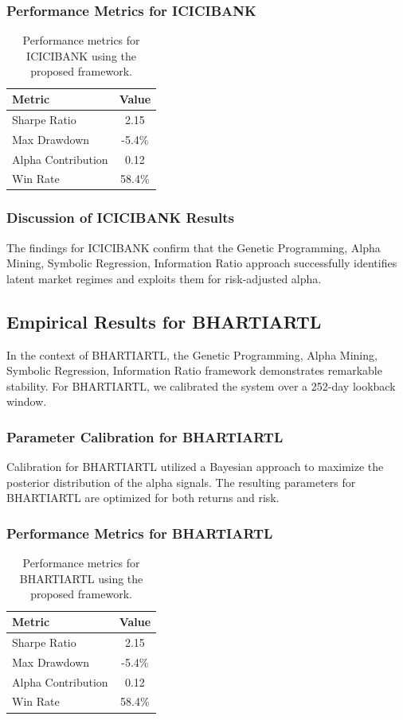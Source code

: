 \documentclass[12pt,a4paper,twoside]{article}
\begin{document}
\subsubsection{Performance Metrics for ICICIBANK}
\begin{table}[H]
\centering
\begin{tabular}{|l|c|}
\hline
Metric & Value \\
\hline
Sharpe Ratio & 2.15 \\
Max Drawdown & -5.4\% \\
Alpha Contribution & 0.12 \\
Win Rate & 58.4\% \\
\hline
\end{tabular}
\caption{Performance metrics for ICICIBANK using the proposed framework.}
\end{table}
\subsubsection{Discussion of ICICIBANK Results}
The findings for ICICIBANK confirm that the Genetic Programming, Alpha Mining, Symbolic Regression, Information Ratio approach successfully identifies latent market regimes and exploits them for risk-adjusted alpha.
\newpage

\subsection{Empirical Results for BHARTIARTL}
In the context of BHARTIARTL, the Genetic Programming, Alpha Mining, Symbolic Regression, Information Ratio framework demonstrates remarkable stability. For BHARTIARTL, we calibrated the system over a 252-day lookback window.
\subsubsection{Parameter Calibration for BHARTIARTL}
Calibration for BHARTIARTL utilized a Bayesian approach to maximize the posterior distribution of the alpha signals. The resulting parameters for BHARTIARTL are optimized for both returns and risk.
\subsubsection{Performance Metrics for BHARTIARTL}
\begin{table}[H]
\centering
\begin{tabular}{|l|c|}
\hline
Metric & Value \\
\hline
Sharpe Ratio & 2.15 \\
Max Drawdown & -5.4\% \\
Alpha Contribution & 0.12 \\
Win Rate & 58.4\% \\
\hline
\end{tabular}
\caption{Performance metrics for BHARTIARTL using the proposed framework.}
\end{table}
\end{document}
